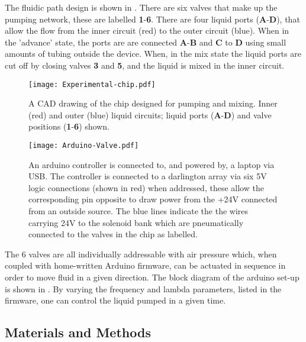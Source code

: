 The fluidic path design is shown in . There are six valves that make up the pumping network,
these are labelled \textbf{1}-\textbf{6}. There are four liquid ports (\textbf{A}-\textbf{D}), that allow the
flow from the inner circuit (red) to the outer circuit (blue). When in the 'advance' state, the ports are
are connected \textbf{A}-\textbf{B} and \textbf{C} to \textbf{D} using small amounts of tubing outside the device. When,
in the mix state the liquid ports are cut off by closing valves \textbf{3} and \textbf{5}, and the liquid is mixed in the
inner circuit.

\begin{figure}[ht]
  \begin{center}
  \texttt{[image: Experimental-chip.pdf]}
  \caption{A CAD drawing of the chip designed for pumping and mixing. Inner (red) and outer (blue) liquid circuits; liquid ports
  (\textbf{A}-\textbf{D}) and valve positions (\textbf{1}-\textbf{6}) shown.}
  \label{fig:Chip}
  \end{center}
\end{figure}

\begin{figure}[ht]
  \begin{center}
  \texttt{[image: Arduino-Valve.pdf]}
  \end{center}
  \caption{An arduino controller is connected to, and powered by, a laptop via USB. The controller is connected
  to a darlington array via six 5V logic connections (shown in red) when addressed, these allow the corresponding pin
  opposite to draw power from the +24V connected from an outside source. The blue lines indicate the the wires
  carrying 24V to the solenoid bank which are pneumatically connected to the valves in the chip as labelled. }
  \label{fig:ValveSetup}
\end{figure}

The 6 valves are all individually addressable with air pressure which, when
coupled with home-written Arduino firmware, can be actuated in sequence in order to move
fluid in a given direction. The block diagram of the arduino set-up is shown in
. By varying the frequency and lambda parameters, listed in the
firmware, one can control the liquid pumped in a given time.



\newpage

\subsection{Materials and Methods}

